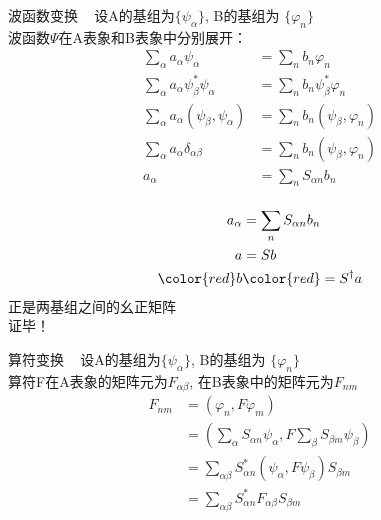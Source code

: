 \begin{frame} {波函数变换}
    \例[17、试证明同一波函数在两不同表象中的矩阵之间的变换是幺正变换]{}  
    \证~ 设A的基组为$\{\psi_\alpha \}$, B的基组为 $\{\varphi_n\}$\\
    波函数$\Psi$在A表象和B表象中分别展开：
    \begin{equation*}
        \begin{split}
            \sum_\alpha a_\alpha \psi_\alpha &= \sum_n b_n \varphi_n \\
            \sum_\alpha a_\alpha \psi_\beta ^* \psi_\alpha &= \sum_n b_n \psi_\beta ^* \varphi_n \\
            \sum_\alpha a_\alpha (\psi_\beta, \psi_\alpha) &= \sum_n b_n (\psi_\beta, \varphi_n) \\
            \sum_\alpha a_\alpha \delta_{\alpha\beta} &= \sum_n b_n (\psi_\beta, \varphi_n) \\
            a_\alpha &= \sum_n S_{\alpha n} b_n\\
        \end{split} 
    \end{equation*}
\end{frame}

\begin{frame} 
    \begin{equation*}
        \begin{split}
            a_\alpha &= \sum_n S_{\alpha n} b_n\\
            a&=Sb\\
            \color{red} b& \color{red}=S^{\dagger}a   
        \end{split} 
    \end{equation*}
    正是两基组之间的幺正矩阵\\
    证毕！\\
\end{frame}


\begin{frame} {算符变换}
    \例[18、试证明同一力学量算符在两不同表象中的矩阵变换是幺正变换]{}  
    \证~ 设A的基组为$\{\psi_\alpha \}$, B的基组为 $\{\varphi_n\}$\\
    算符F在A表象的矩阵元为$F_{\alpha\beta}$, 在B表象中的矩阵元为$F_{nm}$
    \begin{equation*}
        \begin{split}
            F_{nm} &= (\varphi_n, F\varphi_m) \\
            &= (\sum_{\alpha} S_{\alpha n}\psi_\alpha, F \sum_{\beta} S_{\beta m}\psi_\beta)\\
            &= \sum_{\alpha\beta} S_{\alpha n} ^* (\psi_\alpha, F \psi_\beta) S_{\beta m}\\
            &= \sum_{\alpha\beta} S_{\alpha n} ^* F_{\alpha\beta} S_{\beta m}
        \end{split} 
    \end{equation*}
\end{frame}


